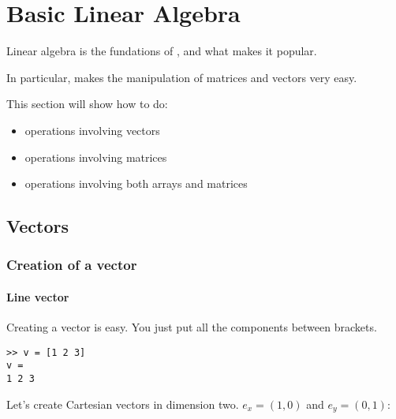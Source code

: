 \subsection{}


















\chapter{Basic Linear Algebra}

Linear algebra is the fundations of \matlab, and what makes it popular.

In particular, \matlab makes the manipulation of matrices and vectors very easy.

This section will show how to do:
\begin{itemize}
	\item operations involving vectors
	\item operations involving matrices
	\item operations involving both arrays and matrices
\end{itemize}


\section{Vectors}
\subsection{Creation of a vector}
\subsubsection{Line vector}
Creating a vector  is easy. You just put all the components between brackets.
\begin{lstlisting}
>> v = [1 2 3]
v =
1 2 3
\end{lstlisting}

Let's create Cartesian vectors in dimension two. $e_x = (1,0)$ and $e_y = (0,1)$:


